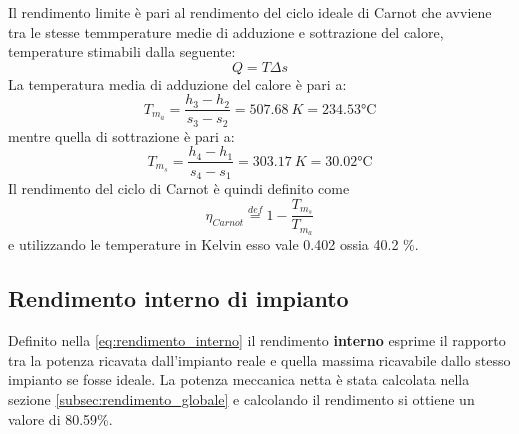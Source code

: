 \documentclass[a4paper,12pt]{article}
\begin{document}
Il rendimento limite è pari al rendimento del ciclo ideale di Carnot che avviene tra le stesse temmperature medie di adduzione e sottrazione
del calore, temperature stimabili dalla seguente:
\begin{equation}
    \label{eq:T_ds}
    Q = T\Delta s
\end{equation}
La temperatura media di adduzione del calore è pari a:
\begin{equation*}
    T_{m_a} = \frac{h_3-h_2}{s_3 - s_2} = 507.68\ K = 234.53 \text{°C}
\end{equation*}
mentre quella di sottrazione è pari a:
\begin{equation*}
    T_{m_s} = \frac{h_4 - h_1}{s_4 - s_1} = 303.17\ K = 30.02 \text{°C}
\end{equation*}
Il rendimento del ciclo di Carnot è quindi definito come
\begin{equation}
    \eta_{Carnot} \stackrel{def}{=} 1 - \frac{T_{m_s}}{T_{m_a}}
\end{equation}
e utilizzando le temperature in Kelvin esso vale 0.402 ossia 40.2 \%.

\subsection{Rendimento interno di impianto}
Definito nella \eqref{eq:rendimento_interno} il rendimento \textbf{interno} esprime il rapporto tra la potenza ricavata dall'impianto reale
e quella massima ricavabile dallo stesso impianto se fosse ideale.
La potenza meccanica netta è stata calcolata nella sezione \ref{subsec:rendimento_globale} e calcolando il rendimento si ottiene un valore di 
80.59\%.
\end{document}
